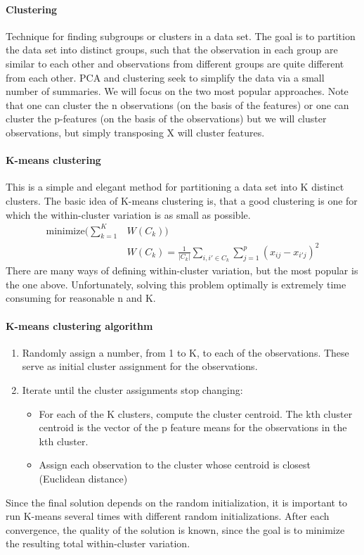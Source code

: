 \documentclass[../document.tex]{subfiles}
\begin{document}
	\paragraph{Clustering}
	Technique for finding subgroups or clusters in a data set. The goal is to partition the data set into distinct groups, such that the observation in each group are similar to each other and observations from different groups are quite different from each other. PCA and clustering seek to simplify the data via a small number of summaries. We will focus on the two most popular approaches. Note that one can cluster the n observations (on the basis of the features) or one can cluster the p-features (on the basis of the observations) but we will cluster observations, but simply transposing X will cluster features.

	\paragraph{K-means clustering}
	This is a simple and elegant method for partitioning a data set into K distinct clusters. The basic idea of K-means clustering is, that a good clustering is one for which the within-cluster variation is as small as possible.
	\begin{equation}
	\begin{split}
		\text{minimize}(\sum_{k=1}^{K}&W(C_{k}))\\
		&W(C_{k})=\frac{1}{|C_{k}|}\sum_{i,i'\in C_{k}}\sum_{j=1}^{p}(x_{ij}-x_{i'j})^2
	\end{split}
	\end{equation}
	There are many ways of defining within-cluster variation, but the most popular is the one above. Unfortunately, solving this problem optimally is extremely time consuming for reasonable n and K.

	\paragraph{K-means clustering algorithm}
	\begin{enumerate}
		\item Randomly assign a number, from 1 to K, to each of the observations. These serve as initial cluster assignment for the observations.
		\item Iterate until the cluster assignments stop changing:
		\begin{itemize}
			\item For each of the K clusters, compute the cluster centroid. The kth cluster centroid is the vector of the p feature means for the observations in the kth cluster.
			\item Assign each observation to the cluster whose centroid is closest (Euclidean distance)
		\end{itemize}
	\end{enumerate}
	Since the final solution depends on the random initialization, it is important to run K-means several times with different random initializations. After each convergence, the quality of the solution is known, since the goal is to minimize the resulting total within-cluster variation.
\end{document}

